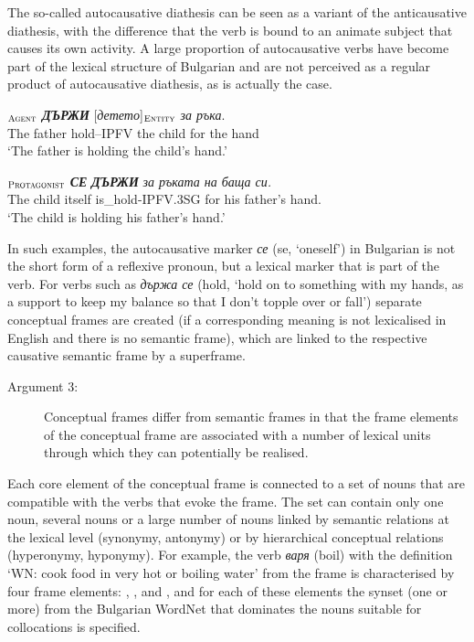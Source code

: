 \documentclass[output=paper,colorlinks,citecolor=brown]{langscibook}
\begin{document}
The so-called autocausative diathesis can be seen as a variant of the anticausative diathesis, with the difference that the verb is bound to an animate subject that causes its own activity. A large proportion of autocausative verbs have become part of the lexical structure of Bulgarian and are not perceived as a regular product of autocausative diathesis, as is actually the case.

\begin{exe}
 \ex  \label{ch01:ex:15}
 $_{\text{\textsc{Agent}}}$   \textit{\textbf{ДЪРЖИ}}  [\textit{детето}]$_{\text{\textsc{Entity}}}$ \textit{за ръка}.\\
{The father}  hold--IPFV {the child} {for the hand} \\
 \glt `The father is holding the child's hand.' 
 \end{exe}
 
\begin{exe}
 \ex  \label{ch01:ex:16}
$_{\text{\textsc{Protagonist}}}$   \textit{\textbf{СЕ}} \textit{\textbf{ДЪРЖИ}} \textit{за ръката на баща си.}\\
{The child}  itself is\_hold-IPFV.3SG {for his father's hand}. \\
\glt `{The child is holding his father's hand}.'
\end{exe}

In such examples, the autocausative marker \textit{се} (se, `oneself') in Bulgarian is not the short form of a reflexive pronoun, but a lexical marker that is part of the verb. For verbs such as \textit{държа се} (hold, `hold on to something with my hands, as a support to keep my balance so that I don't topple over or fall') separate conceptual frames are created (if a corresponding meaning is not lexicalised in English and there is no semantic frame), which are linked to the respective causative semantic frame by a superframe.

\begin{description}
    \item[Argument 3:] Conceptual frames differ from semantic frames in that the frame elements of the conceptual frame are associated with a number of lexical units through which they can potentially be realised.
\end{description}
Each core element of the conceptual frame is connected to a set of nouns that are compatible with the verbs that evoke the frame. The set can contain only one noun, several nouns or a large number of nouns linked by semantic relations at the lexical level (synonymy, antonymy) or by hierarchical conceptual relations (hyperonymy, hyponymy). For example, the verb \textit{варя} (boil) with the definition `WN: cook food in very hot or boiling water' from the frame  is characterised by four frame elements: , ,  and , and for each of these elements the synset (one or more) from the Bulgarian WordNet that dominates the nouns suitable for collocations is specified.
\end{document}
